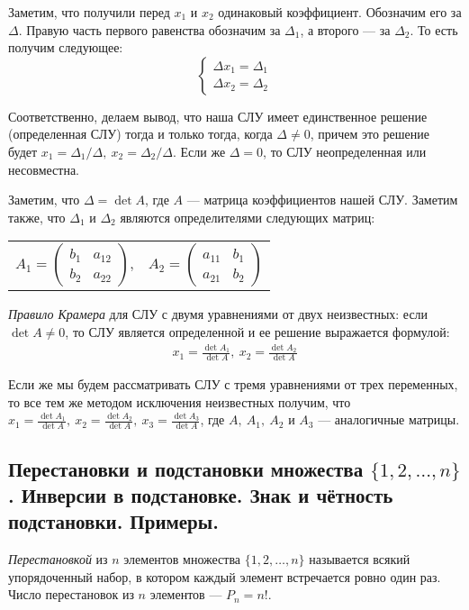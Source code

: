 \documentclass[a4paper, 12pt]{article}
\begin{document}
Заметим, что получили перед $x_1$ и $x_2$ одинаковый коэффициент. Обозначим его за $\Delta$. Правую часть первого равенства обозначим за $\Delta_1$, а второго — за $\Delta_2$. То есть получим следующее:
$$
\begin{cases}
\Delta x_1 = \Delta_1 \\
\Delta x_2 = \Delta_2
\end{cases}
$$

Соответственно, делаем вывод, что наша СЛУ имеет единственное решение (определенная СЛУ) тогда и только тогда, когда $\Delta \not=0$, причем это решение будет $x_1 = \Delta_1 / \Delta,\ x_2 = \Delta_2 / \Delta$. Если же $\Delta = 0$, то СЛУ неопределенная или несовместна.

Заметим, что $\Delta = \det A$, где $A$ — матрица коэффициентов нашей СЛУ. Заметим также, что $\Delta_1$ и $\Delta_2$ являются определителями следующих матриц:
\begin{center}
\begin{tabular}{cc}
$A_1 = \begin{pmatrix}
b_1 & a_{12} \\
b_2 & a_{22}
\end{pmatrix}$,
&
$A_2 = \begin{pmatrix}
a_{11} & b_1 \\
a_{21} & b_2
\end{pmatrix}$
\end{tabular}
\end{center}

\textit{Правило Крамера} для СЛУ с двумя уравнениями от двух неизвестных: если $\det A \not= 0$, то СЛУ является определенной и ее решение выражается формулой:
\begin{gather*}
x_1 = \frac{\det A_1}{\det A},\  x_2 = \frac{\det A_2}{\det A}
\end{gather*}

Если же мы будем рассматривать СЛУ с тремя уравнениями от трех переменных, то все тем же методом исключения неизвестных получим, что $x_1 = \frac{\det A_1} {\det A},\ x_2 = \frac{\det A_2}{\det A},\ x_3 = \frac{\det A_3}{\det A}$, где $A,\ A_1,\ A_2$ и $A_3$ — аналогичные матрицы.

\subsection{Перестановки и подстановки множества $\{1, 2, \ldots, n\}$. Инверсии в подстановке. Знак и чётность подстановки. Примеры.}
\textit{Перестановкой} из $n$ элементов множества $\{1, 2, \ldots , n\}$ называется всякий упорядоченный набор, в котором каждый элемент  встречается ровно один раз.
Число перестановок из $n$ элементов --- $P_n = n!$.
\end{document}
